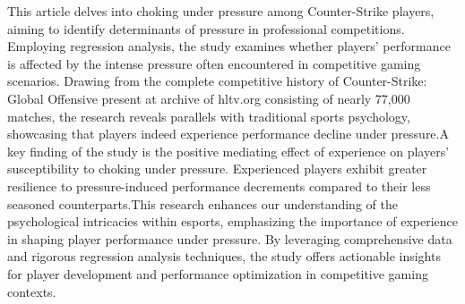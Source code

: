 
\begin{Abstrakt}
    This article delves into choking under pressure among Counter-Strike players, aiming to identify determinants of pressure in professional competitions. Employing regression analysis, the study examines whether players' performance is affected by the intense pressure often encountered in competitive gaming scenarios. Drawing from the complete competitive history of Counter-Strike: Global Offensive present at archive of hltv.org consisting of nearly 77,000 matches, the research reveals parallels with traditional sports psychology, showcasing that players indeed experience performance decline under pressure.\newline A key finding of the study is the positive mediating effect of experience on players' susceptibility to choking under pressure. Experienced players exhibit greater resilience to pressure-induced performance decrements compared to their less seasoned counterparts.\newline This research enhances our understanding of the psychological intricacies within esports, emphasizing the importance of experience in shaping player performance under pressure. By leveraging comprehensive data and rigorous regression analysis techniques, the study offers actionable insights for player development and performance optimization in competitive gaming contexts.
\end{Abstrakt}



\clearpage